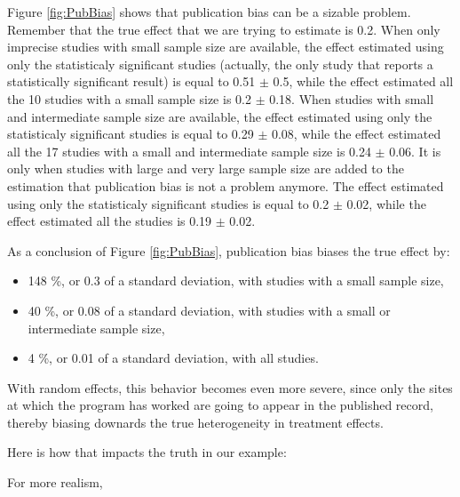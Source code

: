 \documentclass[]{book}
\providecommand{\tightlist}{%
  \setlength{\itemsep}{0pt}\setlength{\parskip}{0pt}}
\theoremstyle{definition}
\theoremstyle{definition}
\theoremstyle{definition}
\theoremstyle{remark}
\let\BeginKnitrBlock\begin \let\EndKnitrBlock\end
\begin{document}
Figure \ref{fig:PubBias} shows that publication bias can be a sizable problem.
Remember that the true effect that we are trying to estimate is 0.2.
When only imprecise studies with small sample size are available, the effect estimated using only the statisticaly significant studies (actually, the only study that reports a statistically significant result) is equal to 0.51 \(\pm\) 0.5, while the effect estimated all the 10 studies with a small sample size is 0.2 \(\pm\) 0.18.
When studies with small and intermediate sample size are available, the effect estimated using only the statisticaly significant studies is equal to 0.29 \(\pm\) 0.08, while the effect estimated all the 17 studies with a small and intermediate sample size is 0.24 \(\pm\) 0.06.
It is only when studies with large and very large sample size are added to the estimation that publication bias is not a problem anymore.
The effect estimated using only the statisticaly significant studies is equal to 0.2 \(\pm\) 0.02, while the effect estimated all the studies is 0.19 \(\pm\) 0.02.

As a conclusion of Figure \ref{fig:PubBias}, publication bias biases the true effect by:

\begin{itemize}
\tightlist
\item
  148 \%, or 0.3 of a standard deviation, with studies with a small sample size,
\item
  40 \%, or 0.08 of a standard deviation, with studies with a small or intermediate sample size,
\item
  4 \%, or 0.01 of a standard deviation, with all studies.
\end{itemize}

With random effects, this behavior becomes even more severe, since only the sites at which the program has worked are going to appear in the published record, thereby biasing downards the true heterogeneity in treatment effects.

\BeginKnitrBlock{example}
\protect\hypertarget{exm:unnamed-chunk-164}{}{\label{exm:unnamed-chunk-164} }Here is how that impacts the truth in our example:
\EndKnitrBlock{example}

For more realism,
\end{document}
